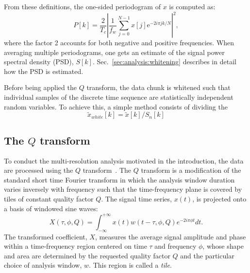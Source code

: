 From these definitions, the one-sided periodogram of $x$ is computed as:
\begin{equation}
  P[k]= \frac{2}{T_c}\left| \frac{1}{f_w}\sum_{j=0}^{N-1}{x[j]\mathrm{e}^{-2i\pi jk/N}} \right|^2,
\end{equation}
where the factor 2 accounts for both negative and positive frequencies. When averaging multiple periodograms, one gets an estimate of the signal power spectral density (PSD), $S[k]$. Sec.~\ref{sec:analysis:whitening} describes in detail how the PSD is estimated. 

Before being applied the $Q$ transform, the data chunk is whitened such that individual samples of the discrete time sequence are statistically independent random variables. To achieve this, a simple method consists of dividing the 
\begin{equation}
  \tilde{x}_{white}[k] = \tilde{x}[k]/S_n[k]
\end{equation}


\subsection{The $Q$ transform} \label{sec:analysis:qtransform}
To conduct the multi-resolution analysis motivated in the introduction, the data are processed using the $Q$ transform~\cite{Brown:1991}. The $Q$ transform is a modification of the standard short time Fourier transform in which the analysis window duration varies inversely with frequency such that the time-frequency plane is covered by tiles of constant quality factor $Q$. The signal time series, $x(t)$, is projected onto a basis of windowed sine waves:
\begin{equation}
  X(\tau, \phi, Q) = \int_{-\infty}^{+\infty}{ x(t) w(t-\tau,\phi,Q) e^{-2i\pi\phi t}dt}.
  \label{eq:qtransform1}
\end{equation}
The transformed coefficient, $X$, measures the average signal amplitude and phase within a time-frequency region centered on time $\tau$ and frequency $\phi$, whose shape and area are determined by the requested quality factor $Q$ and the particular choice of analysis window, $w$. This region is called a \textit{tile}.

